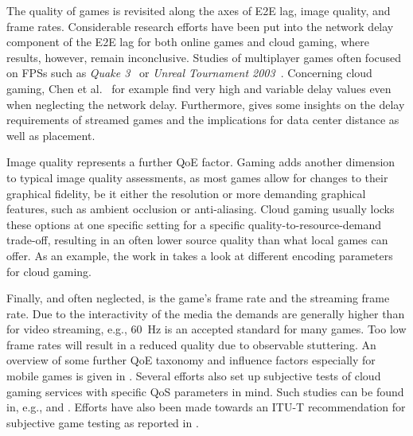 The quality of games is revisited along the axes of \gls{E2E} lag, image quality, and frame rates.
Considerable research efforts have been put into the network delay component of the \gls{E2E} lag for both online games and cloud gaming, where results, however, remain inconclusive. Studies of multiplayer games often focused on \glspl{FPS} such as \textit{Quake 3}~\cite{1266180} or \textit{Unreal Tournament 2003}~\cite{Beigbeder:2004:ELL:1016540.1016556}. Concerning cloud gaming, Chen et al.~\cite{6670099} for example find very high and variable delay values even when neglecting the network delay. Furthermore, \cite{Choy:2012:BSC:2501560.2501563} gives some insights on the delay requirements of streamed games and the implications for data center distance as well as placement.

Image quality represents a further \gls{QoE} factor. Gaming adds another dimension to typical image quality assessments, as most games allow for changes to their graphical fidelity, be it either the resolution or more demanding graphical features, such as ambient occlusion or anti-aliasing. Cloud gaming usually locks these options at one specific setting for a specific quality-to-resource-demand trade-off, resulting in an often lower source quality than what local games can offer. As an example, the work in \cite{slivarimpact} takes a look at different encoding parameters for cloud gaming.%

Finally, and often neglected, is the game's frame rate and the streaming frame rate. Due to the interactivity of the media the demands are generally higher than for video streaming, e.g., \SI{60}{\hertz} is an accepted standard for many games. Too low frame rates will result in a reduced quality due to observable stuttering. 
An overview of some further \gls{QoE} taxonomy and influence factors especially for mobile games is given in \cite{beyer2014typedisplaydelayimpact}. Several efforts also set up subjective tests of cloud gaming services with specific \gls{QoS} parameters in mind. Such studies can be found in, e.g., \cite{Jarschel20132883} and  \cite{6614351}. Efforts have also been made towards an \acrshort{ITU-T} recommendation for subjective game testing as reported in \cite{mollertowards}.






